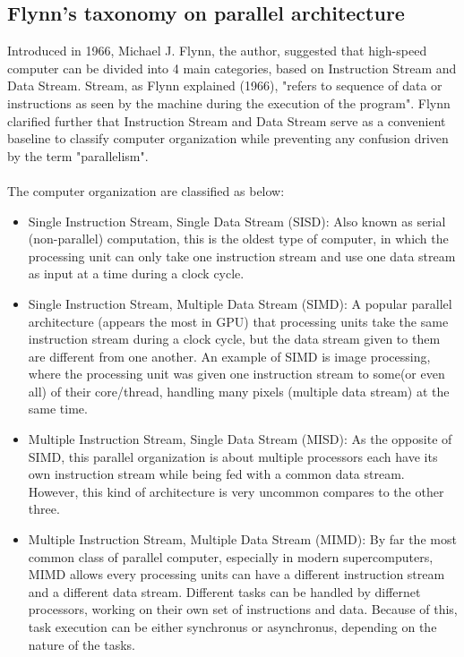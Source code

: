 \subsection{Flynn's taxonomy on parallel architecture}

Introduced in 1966, Michael J. Flynn, the author, suggested that high-speed computer can be divided into 4 main categories, based on Instruction Stream and Data Stream. Stream, as Flynn explained (1966), "refers to sequence of data or instructions as seen by the machine during the execution of the program". Flynn clarified further that Instruction Stream and Data Stream serve as a convenient baseline to classify computer organization while preventing any confusion driven by the term "parallelism". \\
~\\
The computer organization are classified as below:
\begin{itemize}
	\item Single Instruction Stream, Single Data Stream (SISD): Also known as serial (non-parallel) computation, this is the oldest type of computer, in which the processing unit can only take one instruction stream and use one data stream as input at a time during a clock cycle.
	\item Single Instruction Stream, Multiple Data Stream (SIMD): A popular parallel architecture (appears the most in GPU) that processing units take the same instruction stream during a clock cycle, but the data stream given to them are different from one another. An example of SIMD is image processing, where the processing unit was given one instruction stream to some(or even all) of their core/thread, handling many pixels (multiple data stream) at the same time.
	\item Multiple Instruction Stream, Single Data Stream (MISD): As the opposite of SIMD, this parallel organization is about multiple processors each have its own instruction stream while being fed with a common data stream. However, this kind of architecture is very uncommon compares to the other three.
	\item Multiple Instruction Stream, Multiple Data Stream (MIMD): By far the most common class of parallel computer, especially in modern supercomputers, MIMD allows every processing units can have a different instruction stream and a different data stream. Different tasks can be handled by differnet processors, working on their own set of instructions and data. Because of this, task execution can be either synchronus or asynchronus, depending on the nature of the tasks.
\end{itemize}


